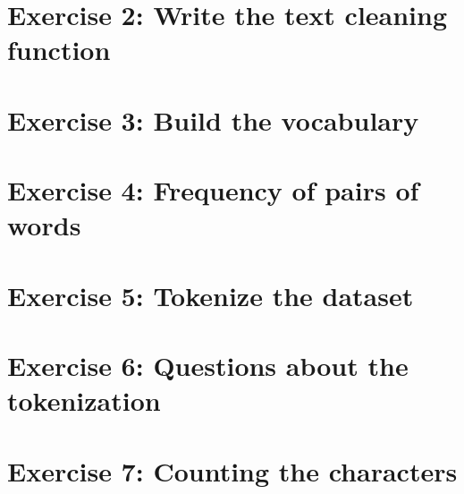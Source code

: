 \documentclass[11pt]{article}
\begin{document}





\section{Exercise 2: Write the text cleaning function}

\section{Exercise 3: Build the vocabulary}

\section{Exercise 4: Frequency of pairs of words}

\section{Exercise 5: Tokenize the dataset}

\section{Exercise 6: Questions about the tokenization}

\section{Exercise 7: Counting the characters}
\end{document}
